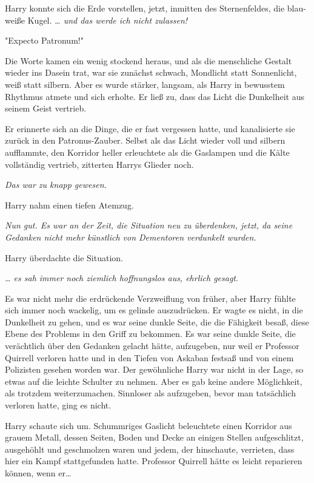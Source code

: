 {Harry konnte sich die Erde vorstellen, jetzt, inmitten des Sternenfeldes, die blau-weiße Kugel. \emph{… und das werde ich nicht zulassen!}

"Expecto Patronum!"

Die Worte kamen ein wenig stockend heraus, und als die menschliche Gestalt wieder ins Dasein trat, war sie zunächst schwach, Mondlicht statt Sonnenlicht, weiß statt silbern. Aber es wurde stärker, langsam, als Harry in bewusstem Rhythmus atmete und sich erholte. Er ließ zu, dass das Licht die Dunkelheit aus seinem Geist vertrieb.

Er erinnerte sich an die Dinge, die er fast vergessen hatte, und kanalisierte sie zurück in den Patronus-Zauber. Selbst als das Licht wieder voll und silbern aufflammte, den Korridor heller erleuchtete als die Gaslampen und die Kälte vollständig vertrieb, zitterten Harrys Glieder noch.

\emph{Das war zu knapp gewesen.}

Harry nahm einen tiefen Atemzug.

\emph{Nun gut. Es war an der Zeit, die Situation neu zu überdenken, jetzt, da seine Gedanken nicht mehr künstlich von Dementoren verdunkelt wurden.}

Harry überdachte die Situation.

\emph{… es sah immer noch ziemlich hoffnungslos aus, ehrlich gesagt}.

Es war nicht mehr die erdrückende Verzweiflung von früher, aber Harry fühlte sich immer noch wackelig, um es gelinde auszudrücken. Er wagte es nicht, in die Dunkelheit zu gehen, und es war seine dunkle Seite, die die Fähigkeit besaß, diese Ebene des Problems in den Griff zu bekommen. Es war seine dunkle Seite, die verächtlich über den Gedanken gelacht hätte, aufzugeben, nur weil er Professor Quirrell verloren hatte und in den Tiefen von Askaban festsaß und von einem Polizisten gesehen worden war. Der gewöhnliche Harry war nicht in der Lage, so etwas auf die leichte Schulter zu nehmen. Aber es gab keine andere Möglichkeit, als trotzdem weiterzumachen. Sinnloser als aufzugeben, bevor man tatsächlich verloren hatte, ging es nicht.

Harry schaute sich um. Schummriges Gaslicht beleuchtete einen Korridor aus grauem Metall, dessen Seiten, Boden und Decke an einigen Stellen aufgeschlitzt, ausgehöhlt und geschmolzen waren und jedem, der hinschaute, verrieten, dass hier ein Kampf stattgefunden hatte. Professor Quirrell hätte es leicht reparieren können, wenn er…

}

